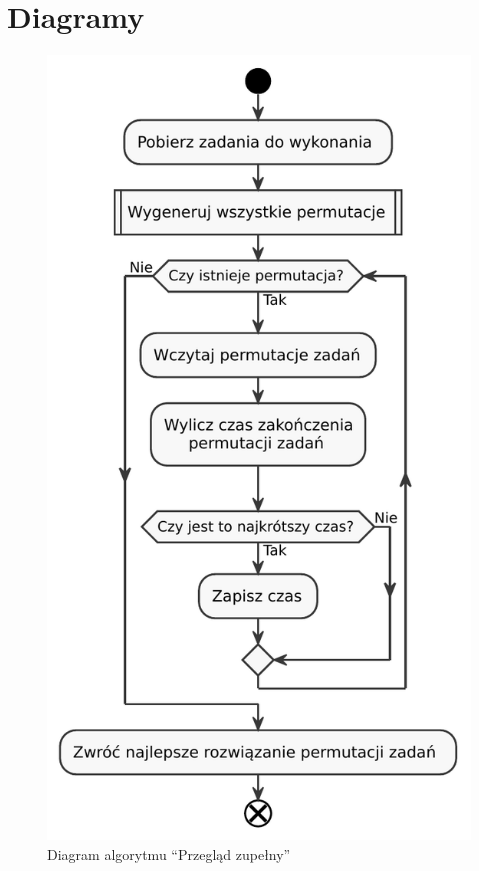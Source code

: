 \section{Diagramy}
\begin{figure}[H]
	\centering
	\includegraphics[]{chapters/chapter4/brute_force.pdf}
	\caption{Diagram algorytmu ``Przegląd zupełny''}
	\label{brute_force}
\end{figure}

